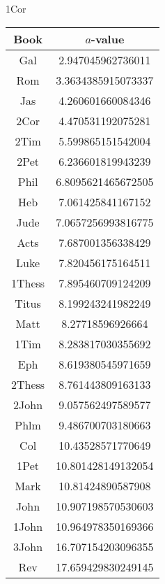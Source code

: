 \documentclass[12pt,letterpaper]{article}
\begin{document}
1Cor
\begin{longtable}{|c|c|}
\hline
 Book & $a$-value \\ \hline
Gal & 2.947045962736011 \\ \hline
 Rom & 3.3634385915073337 \\ \hline
 Jas & 4.260601660084346 \\ \hline
 2Cor & 4.470531192075281 \\ \hline
 2Tim & 5.599865151542004 \\ \hline
 2Pet & 6.236601819943239 \\ \hline
 Phil & 6.8095621465672505 \\ \hline
 Heb & 7.061425841167152 \\ \hline
 Jude & 7.0657256993816775 \\ \hline
 Acts & 7.687001356338429 \\ \hline
 Luke & 7.820456175164511 \\ \hline
 1Thess & 7.895460709124209 \\ \hline
 Titus & 8.199243241982249 \\ \hline
 Matt & 8.27718596926664 \\ \hline
 1Tim & 8.283817030355692 \\ \hline
 Eph & 8.619380545971659 \\ \hline
 2Thess & 8.761443809163133 \\ \hline
 2John & 9.057562497589577 \\ \hline
 Phlm & 9.486700703180663 \\ \hline
 Col & 10.43528571770649 \\ \hline
 1Pet & 10.801428149132054 \\ \hline
 Mark & 10.81424890587908 \\ \hline
 John & 10.907198570530603 \\ \hline
 1John & 10.964978350169366 \\ \hline
 3John & 16.707154203096355 \\ \hline
 Rev & 17.659429830249145 \\ \hline 
\end{longtable}
\end{document}
